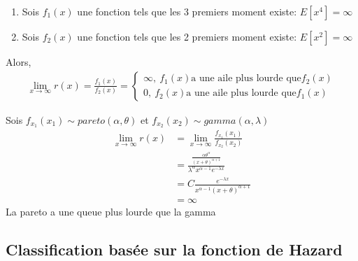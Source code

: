 \documentclass[12pt, french]{report}
\begin{document}
\begin{enumerate}
    \item Sois $f_1(x)$ une fonction tels que les 3 premiers moment existe: $E[x^4] = \infty$
    \item Sois $f_2(x)$ une fonction tels que les 2 premiers moment existe: $E[x^2] = \infty$
\end{enumerate}
Alors,
\begin{align*}
    \lim_{x\to\infty} r(x) = \frac{f_1(x)}{f_2(x)} = \left\{
                                                        \begin{array}{ll}
                                                            \infty ,\: f_1(x) \text{a une aile plus lourde que} f_2(x) \\
                                                            0      ,\: f_2(x) \text{a une aile plus lourde que} f_1(x) 
                                                        \end{array}
                                                    \right.
\end{align*}
\begin{exemple}
    Sois $f_{x_1}(x_1) \sim pareto(\alpha, \theta)$ et $f_{x_2}(x_2) \sim gamma(\alpha, \lambda)$ 
    \begin{align*}
        \lim_{x\to\infty} r(x) &= \lim_{x\to\infty} \frac{f_{x_1}(x_1)}{f_{x_2}(x_2)} \\
                               &= \frac{\frac{\alpha \theta^\alpha}{(x + \theta)^{\alpha + 1}}}{\lambda^\alpha x^{\alpha - 1} e^{-\lambda x}} \\
                               &= C \frac{e^{-\lambda x}}{x^{\alpha - 1} (x + \theta)^{\alpha + 1}} \\
                               &= \infty
    \end{align*}      
    La pareto a une queue plus lourde que la gamma
\end{exemple}


\subsection{Classification basée sur la fonction de Hazard}
\end{document}
